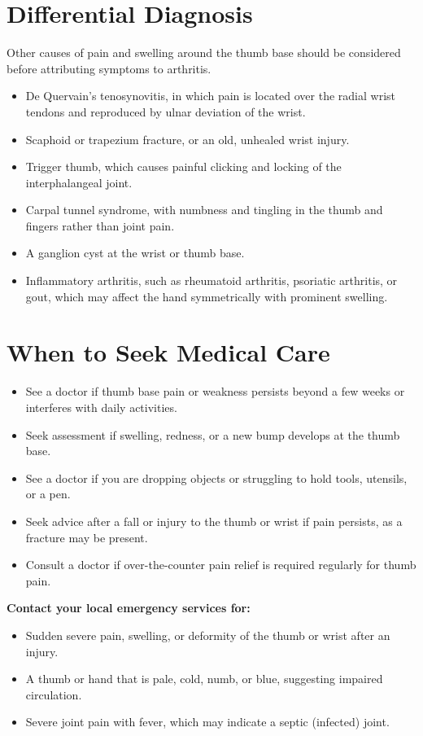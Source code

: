 \section*{Differential Diagnosis}
Other causes of pain and swelling around the thumb base should be considered before attributing symptoms to arthritis.
\begin{itemize}
    \item De Quervain's tenosynovitis, in which pain is located over the radial wrist tendons and reproduced by ulnar deviation of the wrist.
    \item Scaphoid or trapezium fracture, or an old, unhealed wrist injury.
    \item Trigger thumb, which causes painful clicking and locking of the interphalangeal joint.
    \item Carpal tunnel syndrome, with numbness and tingling in the thumb and fingers rather than joint pain.
    \item A ganglion cyst at the wrist or thumb base.
    \item Inflammatory arthritis, such as rheumatoid arthritis, psoriatic arthritis, or gout, which may affect the hand symmetrically with prominent swelling.
\end{itemize}

\section*{When to Seek Medical Care}
\begin{itemize}
    \item See a doctor if thumb base pain or weakness persists beyond a few weeks or interferes with daily activities.
    \item Seek assessment if swelling, redness, or a new bump develops at the thumb base.
    \item See a doctor if you are dropping objects or struggling to hold tools, utensils, or a pen.
    \item Seek advice after a fall or injury to the thumb or wrist if pain persists, as a fracture may be present.
    \item Consult a doctor if over-the-counter pain relief is required regularly for thumb pain.
\end{itemize}

\textbf{Contact your local emergency services for:}
\begin{itemize}
    \item Sudden severe pain, swelling, or deformity of the thumb or wrist after an injury.
    \item A thumb or hand that is pale, cold, numb, or blue, suggesting impaired circulation.
    \item Severe joint pain with fever, which may indicate a septic (infected) joint.
\end{itemize}

